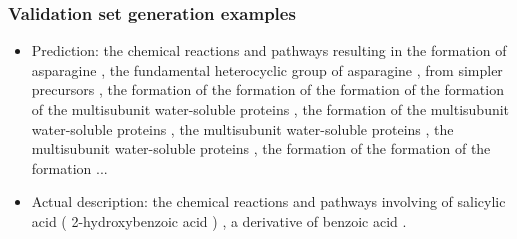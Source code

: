 \documentclass{beamer}
\begin{document}
\begin{frame}
\frametitle{Validation set generation examples}
\begin{itemize}
\item Prediction: the chemical reactions and pathways resulting in the formation of asparagine , the fundamental heterocyclic group of asparagine , from simpler precursors , the formation of the formation of the formation of the formation of the multisubunit water-soluble proteins , the formation of the multisubunit water-soluble proteins , the multisubunit water-soluble proteins , the multisubunit water-soluble proteins , the formation of the formation of the formation ...
\item Actual description: the chemical reactions and pathways involving of salicylic acid ( 2-hydroxybenzoic acid ) , a derivative of benzoic acid .
\end{itemize}
\end{frame}
\end{document}
